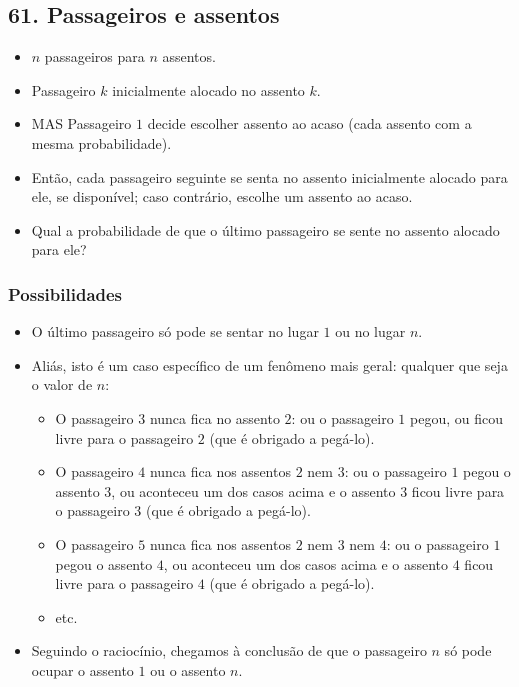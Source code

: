 \documentclass[
  11pt]{report}
\begin{document}
\hypertarget{passageiros-e-assentos}{%
\subsection*{61. Passageiros e assentos}\label{passageiros-e-assentos}}

\begin{rmdbox}

\begin{itemize}
\item
  $n$ passageiros para $n$ assentos.
\item
  Passageiro $k$ inicialmente alocado no assento $k$.
\item
  MAS Passageiro $1$ decide escolher assento ao acaso (cada assento com a mesma probabilidade).
\item
  Então, cada passageiro seguinte se senta no assento inicialmente alocado para ele, se disponível; caso contrário, escolhe um assento ao acaso.
\item
  Qual a probabilidade de que o último passageiro se sente no assento alocado para ele?
\end{itemize}

\end{rmdbox}

\hypertarget{possibilidades}{%
\subsubsection*{Possibilidades}\label{possibilidades}}

\begin{itemize}
\item
  O último passageiro só pode se sentar no lugar $1$ ou no lugar $n$.
\item
  Aliás, isto é um caso específico de um fenômeno mais geral: qualquer que seja o valor de $n$:

  \begin{itemize}
  \item
    O passageiro $3$ nunca fica no assento $2$: ou o passageiro $1$ pegou, ou ficou livre para o passageiro $2$ (que é obrigado a pegá-lo).
  \item
    O passageiro $4$ nunca fica nos assentos $2$ nem $3$: ou o passageiro $1$ pegou o assento $3$, ou aconteceu um dos casos acima e o assento $3$ ficou livre para o passageiro $3$ (que é obrigado a pegá-lo).
  \item
    O passageiro $5$ nunca fica nos assentos $2$ nem $3$ nem $4$: ou o passageiro $1$ pegou o assento $4$, ou aconteceu um dos casos acima e o assento $4$ ficou livre para o passageiro $4$ (que é obrigado a pegá-lo).
  \item
    etc.
  \end{itemize}
\item
  Seguindo o raciocínio, chegamos à conclusão de que o passageiro $n$ só pode ocupar o assento $1$ ou o assento $n$.
\end{itemize}
\end{document}
